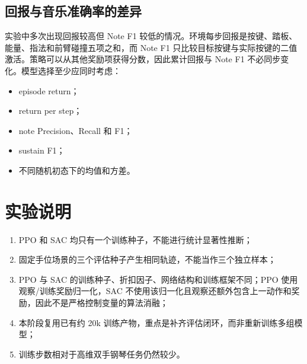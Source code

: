 \documentclass[UTF8,a4paper,11pt]{ctexart}
\begin{document}
\subsection{回报与音乐准确率的差异}

实验中多次出现回报较高但 Note F1 较低的情况。环境每步回报是按键、踏板、能量、指法和前臂碰撞五项之和，而 Note F1 只比较目标按键与实际按键的二值激活。策略可以从其他奖励项获得分数，因此累计回报与 Note F1 不必同步变化。模型选择至少应同时考虑：
\begin{itemize}
  \item episode return；
  \item return per step；
  \item note Precision、Recall 和 F1；
  \item sustain F1；
  \item 不同随机初态下的均值和方差。
\end{itemize}

\section{实验说明}

\begin{enumerate}
  \item PPO 和 SAC 均只有一个训练种子，不能进行统计显著性推断；
  \item 固定手位场景的三个评估种子产生相同轨迹，不能当作三个独立样本；
  \item PPO 与 SAC 的训练种子、折扣因子、网络结构和训练框架不同；PPO 使用观察/训练奖励归一化，SAC 不使用该归一化且观察还额外包含上一动作和奖励，因此不是严格控制变量的算法消融；
  \item 本阶段复用已有约 20k 训练产物，重点是补齐评估闭环，而非重新训练多组模型；
  \item 训练步数相对于高维双手钢琴任务仍然较少。
\end{enumerate}
\end{document}
